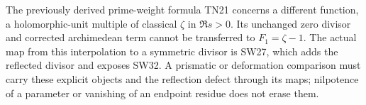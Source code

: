 \documentclass[
  10pt,
  a4paper,
]{article}
\begin{document}
The previously derived prime-weight formula TN21 concerns a different
function, a holomorphic-unit multiple of classical \(\zeta\) in
\(\Re s>0\). Its unchanged zero divisor and corrected archimedean term
cannot be transferred to \(F_1=\zeta-1\). The actual map from this
interpolation to a symmetric divisor is SW27, which adds the reflected
divisor and exposes SW32. A prismatic or deformation comparison must
carry these explicit objects and the reflection defect through its maps;
nilpotence of a parameter or vanishing of an endpoint residue does not
erase them.
\end{document}
